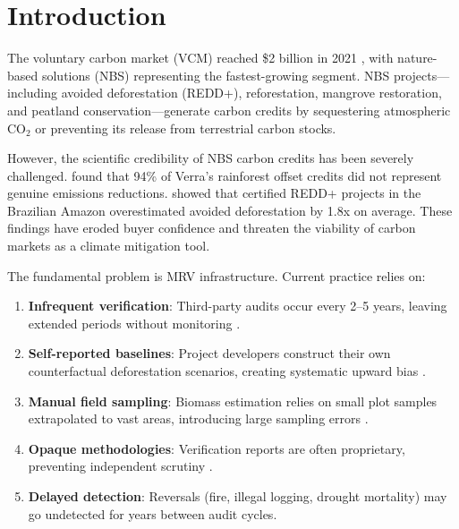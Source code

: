 \section{Introduction}

\label{sec:introduction}

The voluntary carbon market (VCM) reached \$2 billion in 2021
\citep{foresttrends2022}, with nature-based solutions (NBS) representing
the fastest-growing segment. NBS projects---including avoided
deforestation (REDD+), reforestation, mangrove restoration, and peatland
conservation---generate carbon credits by sequestering atmospheric CO$_2$
or preventing its release from terrestrial carbon stocks.

However, the scientific credibility of NBS carbon credits has been
severely challenged. \citet{west2023action} found that 94\% of Verra's
rainforest offset credits did not represent genuine emissions reductions.
\citet{guizar2022carbon} showed that certified REDD+ projects in the
Brazilian Amazon overestimated avoided deforestation by 1.8x on average.
These findings have eroded buyer confidence and threaten the viability of
carbon markets as a climate mitigation tool.

The fundamental problem is MRV infrastructure. Current practice relies
on:

\begin{enumerate}[label=(\roman*)]
  \item \textbf{Infrequent verification}: Third-party audits occur every
    2--5 years, leaving extended periods without monitoring
    \citep{schneider2019double}.
  \item \textbf{Self-reported baselines}: Project developers construct
    their own counterfactual deforestation scenarios, creating systematic
    upward bias \citep{west2023action}.
  \item \textbf{Manual field sampling}: Biomass estimation relies on
    small plot samples extrapolated to vast areas, introducing large
    sampling errors \citep{chave2014improved}.
  \item \textbf{Opaque methodologies}: Verification reports are often
    proprietary, preventing independent scrutiny \citep{badgley2022}.
  \item \textbf{Delayed detection}: Reversals (fire, illegal logging,
    drought mortality) may go undetected for years between audit cycles.
\end{enumerate}

